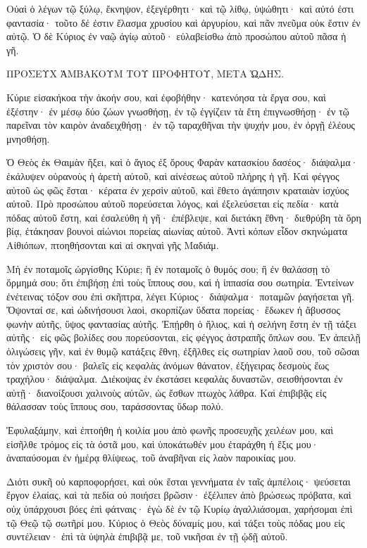 \begin{spacing}{1.1}
\begin{multicols}{2}
Οὐαὶ ὁ λέγων τῷ ξύλῳ, ἔκνηψον, ἐξεγέρθητι· καὶ τῷ λίθῳ, ὑψώθητι· καὶ αὐτό ἐστι φαντασία· τοῦτο δέ ἐστιν ἔλασμα χρυσίου καὶ ἀργυρίου, καὶ πᾶν πνεῦμα οὐκ ἔστιν ἐν αὐτῷ.
Ὁ δὲ Κύριος ἐν ναῷ ἁγίῳ αὐτοῦ· εὐλαβείσθω ἀπὸ προσώπου αὐτοῦ πᾶσα ἡ γῆ.

ΠΡΟΣΕΥΧ ἈΜΒΑΚΟΥΜ ΤΟΥ ΠΡΟΦΗΤΟΥ, ΜΕΤΑ Ὠ̣ΔΗΣ.

Κύριε εἰσακήκοα τὴν ἀκοήν σου, καὶ ἐφοβήθην· κατενόησα τὰ ἔργα σου, καὶ ἐξέστην· ἐν μέσῳ δύο ζώων γνωσθήσῃ, ἐν τῷ ἐγγίζειν τὰ ἔτη ἐπιγνωσθήσῃ· ἐν τῷ παρεῖναι τὸν καιρὸν ἀναδειχθήσῃ· ἐν τῷ ταραχθῆναι τὴν ψυχήν μου, ἐν ὀργῇ ἐλέους μνησθήσῃ.

Ὁ Θεὸς ἐκ Θαιμὰν ἥξει, καὶ ὁ ἅγιος ἐξ ὄρους Φαρὰν κατασκίου δασέος· διάψαλμα· ἐκάλυψεν οὐρανοὺς ἡ ἀρετὴ αὐτοῦ, καὶ αἰνέσεως αὐτοῦ πλήρης ἡ γῆ.
Καὶ φέγγος αὐτοῦ ὡς φῶς ἔσται· κέρατα ἐν χερσὶν αὐτοῦ, καὶ ἔθετο ἀγάπησιν κραταιὰν ἰσχύος αὐτοῦ.
Πρὸ προσώπου αὐτοῦ πορεύσεται λόγος, καὶ ἐξελεύσεται εἰς πεδία· κατὰ πόδας αὐτοῦ
ἔστη, καὶ ἐσαλεύθη ἡ γῆ· ἐπέβλεψε, καὶ διετάκη ἔθνη· διεθρύβη τὰ ὄρη βίᾳ, ἐτάκησαν βουνοὶ αἰώνιοι πορείας αἰωνίας αὐτοῦ.
Ἀντὶ κόπων εἶδον σκηνώματα Αἰθιόπων, πτοηθήσονται καὶ αἱ σκηναὶ γῆς Μαδιάμ.

Μὴ ἐν ποταμοῖς ὠργίσθης Κύριε; ἢ ἐν ποταμοῖς ὁ θυμός σου; ἢ ἐν θαλάσσῃ τὸ ὅρμημά σου; ὅτι ἐπιβήσῃ ἐπὶ τοὺς ἵππους σου, καὶ ἡ ἱππασία σου σωτηρία.
Ἐντείνων ἐνέτεινας τόξον σου ἐπὶ σκῆπτρα, λέγει Κύριος· διάψαλμα· ποταμῶν ῥαγήσεται γῆ.
Ὄψονταί σε, καὶ ὠδινήσουσι λαοὶ, σκορπίζων ὕδατα πορείας· ἔδωκεν ἡ ἄβυσσος φωνὴν αὐτῆς, ὕψος φαντασίας αὐτῆς.
Ἐπῄρθη ὁ ἥλιος, καὶ ἡ σελήνη ἔστη ἐν τῇ τάξει αὐτῆς· εἰς φῶς βολίδες σου πορεύσονται, εἰς φέγγος ἀστραπῆς ὅπλων σου.
Ἐν ἀπειλῇ ὀλιγώσεις γῆν, καὶ ἐν θυμῷ κατάξεις ἔθνη,
ἐξῆλθες εἰς σωτηρίαν λαοῦ σου, τοῦ σῶσαι τὸν χριστόν σου· βαλεῖς εἰς κεφαλὰς ἀνόμων θάνατον, ἐξήγειρας δεσμοὺς ἕως τραχήλου· διάψαλμα.
Διέκοψας ἐν ἐκστάσει κεφαλὰς δυναστῶν, σεισθήσονται ἐν αὐτῇ· διανοίξουσι χαλινοὺς αὐτῶν, ὡς ἔσθων πτωχὸς λάθρα.
Καὶ ἐπιβιβᾷς εἰς θάλασσαν τοὺς ἵππους σου, ταράσσοντας ὕδωρ πολύ.

Ἐφυλαξάμην, καὶ ἐπτοήθη ἡ κοιλία μου ἀπὸ φωνῆς προσευχῆς χειλέων μου, καὶ εἰσῆλθε τρόμος εἰς τὰ ὀστᾶ μου, καὶ ὑποκάτωθέν μου ἐταράχθη ἡ ἕξις μου· ἀναπαύσομαι ἐν ἡμέρᾳ θλίψεως, τοῦ ἀναβῆναι εἰς λαὸν παροικίας μου.

Διότι συκῆ οὐ καρποφορήσει, καὶ οὐκ ἔσται γεννήματα ἐν ταῖς ἀμπέλοις· ψεύσεται ἔργον ἐλαίας, καὶ τὰ πεδία οὐ ποιήσει βρῶσιν· ἐξέλιπεν ἀπὸ βρώσεως πρόβατα, καὶ οὐχ ὑπάρχουσι βόες ἐπὶ φάτναις·
ἐγὼ δὲ ἐν τῷ Κυρίῳ ἀγαλλιάσομαι, χαρήσομαι ἐπὶ τῷ Θεῷ τῷ σωτῆρί μου.
Κύριος ὁ Θεὸς δύναμίς μου, καὶ τάξει τοὺς πόδας μου εἰς συντέλειαν· ἐπὶ τὰ ὑψηλὰ ἐπιβιβᾷ με, τοῦ νικῆσαι ἐν τῇ ᾠδῇ αὐτοῦ.



\end{multicols}
\end{spacing}
